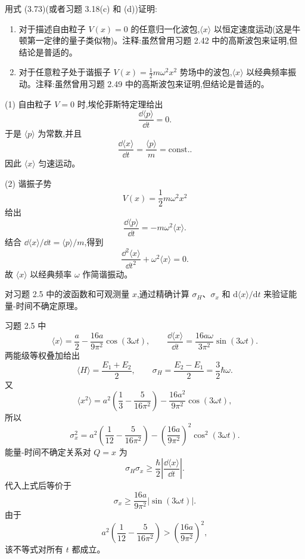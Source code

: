 \begin{question}
用式 (3.73)(或者习题 3.18(c) 和 (d))证明:
\begin{enumerate}
\item 对于描述自由粒子 $V(x)=0$ 的任意归一化波包,$\langle x\rangle$ 以恒定速度运动(这是牛顿第一定律的量子类似物)。注释:虽然曾用习题 2.42 中的高斯波包来证明,但结论是普适的。
\item 对于任意粒子处于谐振子 $V(x)=\frac12m\omega^2x^2$ 势场中的波包,$\langle x\rangle$ 以经典频率振动。注释:虽然曾用习题 2.49 中的高斯波包来证明,但结论是普适的。
\end{enumerate}

\par\smallskip
{}

\begin{solution}
(1) 自由粒子 $V=0$ 时,埃伦菲斯特定理给出
\[
\frac{\dd\langle p\rangle}{\dd t}=0.
\]
于是 $\langle p\rangle$ 为常数,并且
\[
\frac{\dd\langle x\rangle}{\dd t}=\frac{\langle p\rangle}{m}=\mathrm{const.}.
\]
因此 $\langle x\rangle$ 匀速运动。

(2) 谐振子势
\[
V(x)=\frac12m\omega^2x^2
\]
给出
\[
\frac{\dd\langle p\rangle}{\dd t}=-m\omega^2\langle x\rangle.
\]
结合 $\dd\langle x\rangle/\dd t=\langle p\rangle/m$,得到
\[
\frac{\dd^2\langle x\rangle}{\dd t^2}+\omega^2\langle x\rangle=0.
\]
故 $\langle x\rangle$ 以经典频率 $\omega$ 作简谐振动。
\end{solution}
\end{question}

\begin{question}
对习题 2.5 中的波函数和可观测量 $x$,通过精确计算 $\sigma_H$、$\sigma_x$ 和 $\mathrm d\langle x\rangle/\mathrm dt$ 来验证能量-时间不确定原理。
\begin{solution}
习题 2.5 中
\[
\langle x\rangle=\frac a2-\frac{16a}{9\pi^2}\cos(3\omega t),
\qquad
\frac{\dd\langle x\rangle}{\dd t}=\frac{16a\omega}{3\pi^2}\sin(3\omega t).
\]
两能级等权叠加给出
\[
\langle H\rangle=\frac{E_1+E_2}{2},
\qquad
\sigma_H=\frac{E_2-E_1}{2}=\frac32\hbar\omega.
\]
又
\[
\langle x^2\rangle
=a^2\left(\frac13-\frac{5}{16\pi^2}\right)-\frac{16a^2}{9\pi^2}\cos(3\omega t),
\]
所以
\[
\sigma_x^2
=a^2\left(\frac1{12}-\frac{5}{16\pi^2}\right)
-\left(\frac{16a}{9\pi^2}\right)^2\cos^2(3\omega t).
\]
能量-时间不确定关系对 $Q=x$ 为
\[
\sigma_H\sigma_x\ge \frac{\hbar}{2}\left|\frac{\dd\langle x\rangle}{\dd t}\right|.
\]
代入上式后等价于
\[
\sigma_x\ge \frac{16a}{9\pi^2}|\sin(3\omega t)|.
\]
由于
\[
a^2\left(\frac1{12}-\frac{5}{16\pi^2}\right)
>\left(\frac{16a}{9\pi^2}\right)^2,
\]
该不等式对所有 $t$ 都成立。
\end{solution}
\end{question}

